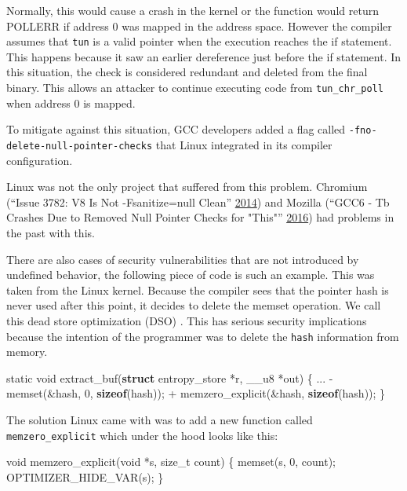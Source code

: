 \documentclass[a4paper,]{report}
\newenvironment{Shaded}{}{}
\newcommand{\DataTypeTok}[1]{\textcolor[rgb]{0.56,0.13,0.00}{#1}}
\newcommand{\DecValTok}[1]{\textcolor[rgb]{0.25,0.63,0.44}{#1}}
\newcommand{\KeywordTok}[1]{\textcolor[rgb]{0.00,0.44,0.13}{\textbf{#1}}}
\newcommand{\NormalTok}[1]{#1}
\begin{document}
Normally, this would cause a crash in the kernel or the function would
return POLLERR if address 0 was mapped in the address space. However the
compiler assumes that \texttt{tun} is a valid pointer when the execution
reaches the if statement. This happens because it saw an earlier
dereference just before the if statement. In this situation, the check
is considered redundant and deleted from the final binary. This allows
an attacker to continue executing code from \texttt{tun\_chr\_poll} when
address 0 is mapped.

To mitigate against this situation, GCC developers added a flag called
\texttt{-fno-delete-null-pointer-checks} that Linux integrated in its
compiler configuration.

Linux was not the only project that suffered from this problem. Chromium
(``Issue 3782: V8 Is Not -Fsanitize=null Clean''
\protect\hyperlink{ref-ChromiumIssue}{2014}) and Mozilla (``GCC6 - Tb
Crashes Due to Removed Null Pointer Checks for "This"''
\protect\hyperlink{ref-MozillaIssue}{2016}) had problems in the past
with this.

There are also cases of security vulnerabilities that are not introduced
by undefined behavior, the following piece of code is such an example.
This was taken from the Linux kernel. Because the compiler sees that the
pointer hash is never used after this point, it decides to delete the
memset operation. We call this dead store optimization (DSO)
. This has serious security implications
because the intention of the programmer was to delete the \texttt{hash}
information from memory.

\begin{Shaded}
\begin{Highlighting}[]
\DataTypeTok{static} \DataTypeTok{void}\NormalTok{ extract_buf(}\KeywordTok{struct}\NormalTok{ entropy_store *r, __u8 *out) \{}
\NormalTok{  ...}
\NormalTok{  - memset(&hash, }\DecValTok{0}\NormalTok{, }\KeywordTok{sizeof}\NormalTok{(hash));}
\NormalTok{  + memzero_explicit(&hash, }\KeywordTok{sizeof}\NormalTok{(hash));}
\NormalTok{\}}
\end{Highlighting}
\end{Shaded}

The solution Linux came with was to add a new function called
\texttt{memzero\_explicit} which under the hood looks like this:

\begin{Shaded}
\begin{Highlighting}[]
\DataTypeTok{void}\NormalTok{ memzero_explicit(}\DataTypeTok{void}\NormalTok{ *s, }\DataTypeTok{size_t}\NormalTok{ count)}
\NormalTok{\{}
\NormalTok{  memset(s, }\DecValTok{0}\NormalTok{, count);}
\NormalTok{  OPTIMIZER_HIDE_VAR(s);}
\NormalTok{\}}
\end{Highlighting}
\end{Shaded}
\end{document}
